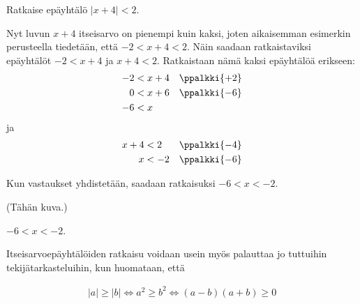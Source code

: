 \begin{esimerkki}
Ratkaise epäyhtälö $|x+4|<2$.

\begin{esimratk}
Nyt luvun $x+4$ itseisarvo on pienempi kuin kaksi, joten aikaisemman esimerkin perusteella tiedetään, että $-2<x+4<2$. Näin saadaan ratkaistaviksi epäyhtälöt $-2<x+4$ ja $x+4<2$. Ratkaistaan nämä kaksi epäyhtälöä erikseen:
\begin{align*}
-2&<x+4 & \ppalkki{+2} \\
0&<x+6 & \ppalkki{-6} \\
-6&<x &
\end{align*}
ja
\begin{align*}
x+4&<2 & \ppalkki{-4} \\
x&<-2 & \ppalkki{-6}
\end{align*}

Kun vastaukset yhdistetään, saadaan ratkaisuksi $-6<x<-2$.

(Tähän kuva.)

\end{esimratk}

\begin{esimvast}
$-6<x<-2$.
\end{esimvast}
\end{esimerkki}

Itseisarvoepäyhtälöiden ratkaisu voidaan usein myös palauttaa jo tuttuihin tekijätarkasteluihin, kun huomataan, että

\begin{align*}
|a| \geq |b| \Leftrightarrow a^2 \geq b^2 \Leftrightarrow (a-b)(a+b) \geq 0
\end{align*}

